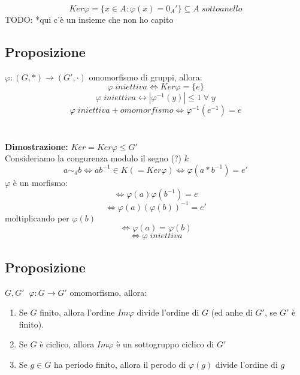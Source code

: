 \[Ker\varphi =\{x\in A:\varphi (x)=0_A'\}\subseteq A\;sottoanello\]
TODO: *qui c'è un insieme che non ho capito 

\subsection{Proposizione}
\(\varphi :(G,*)\rightarrow (G',\cdot)\) omomorfismo di gruppi, allora:
\[\varphi\;iniettiva\Leftrightarrow Ker\varphi=\{e\}\]
\[\varphi\;iniettiva \leftrightarrow |\varphi^{-1}(y)|\leq 1\;\forall\;y\]
\[\varphi\;iniettiva+omomorfismo\Leftrightarrow\varphi ^{-1}(e^{-1})=e\]
\\
\\\textbf{Dimostrazione:} \(Ker=Ker\varphi\leq G'\)
\\Consideriamo la congurenza modulo il segno (?) \(k\)
\[a\sim _db\Leftrightarrow ab^{-1}\in K (=Ker\varphi)\Leftrightarrow\varphi (a*b^{-1})=e'\]
\(\varphi\) è un morfismo:
\[\Leftrightarrow\varphi (a)\varphi (b^{-1})=e\]
\[\Leftrightarrow\varphi(a)(\varphi (b))^{-1}=e'\]
moltiplicando per \(\varphi (b)\)
\[\Leftrightarrow\varphi(a)=\varphi (b)\]
\[\Leftrightarrow\varphi\; iniettiva\]

\subsection{Proposizione}
\(G,G'\;\;\varphi :G\rightarrow G'\) omomorfismo, allora:
\begin{enumerate}

	\item Se \(G\) finito, allora l'ordine \(Im\varphi\) divide l'ordine di \(G\) (ed anhe di \(G'\), se \(G'\) è finito).

	\item Se \(G\) è ciclico, allora \(Im\varphi\) è un sottogruppo ciclico di \(G'\)

	\item Se \(g\in G\) ha periodo finito, allora il perodo di \(\varphi (g)\) divide l'ordine di \(g\)

\end{enumerate}